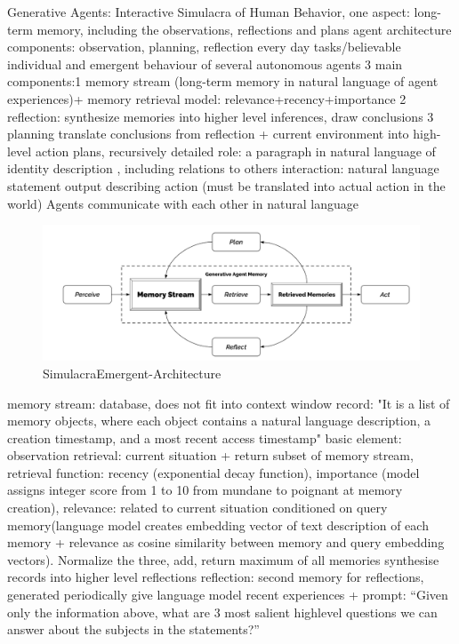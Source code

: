 \documentclass{article}
\begin{document}
\cite{park_generative_2023} Generative Agents: Interactive Simulacra of Human Behavior, one aspect: long-term memory, including the observations, reflections and plans
agent architecture components: observation, planning, reflection
every day tasks/believable individual and emergent behaviour of several autonomous agents
3 main components:1 memory stream (long-term memory in natural language of agent experiences)+ memory retrieval model: relevance+recency+importance
2 reflection: synthesize memories into higher level inferences, draw conclusions
3 planning translate conclusions from reflection  +  current environment into high-level action plans, recursively detailed
role: a paragraph in natural language of identity description , including relations to others
interaction: natural language statement output describing action (must be translated into actual action in the world)
Agents communicate with each other in natural language
\begin{figure}[h]
	\centering
	\includegraphics[width=0.7\linewidth]{SimulacraEmergent-Architecture}
	\caption{SimulacraEmergent-Architecture \cite{park_generative_2023}}
	\label{fig:simulacraemergent-architecture}
\end{figure}
memory stream: database, does not fit into context window
record: "It is a list of memory objects, where each object contains a natural language description, a creation timestamp, and a most recent access timestamp"
basic element: observation
retrieval: current situation + return subset of memory stream, retrieval function: recency (exponential decay function), importance (model assigns integer score from 1 to 10 from mundane to poignant at memory creation), relevance: related to current situation conditioned on query memory(language model creates embedding vector of text description of each memory + relevance as cosine similarity between memory and query embedding vectors). Normalize the three, add, return maximum of all memories
synthesise records into higher level reflections
reflection: second memory for reflections, generated periodically
give language model recent experiences + prompt: “Given only the information above, what are 3 most salient highlevel questions we can answer about the subjects in the statements?”
\end{document}
